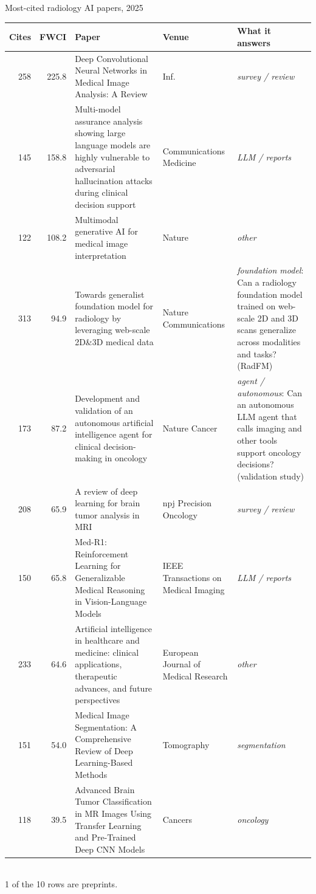 \documentclass[aspectratio=169]{beamer}
\renewcommand{\arraystretch}{1.08}
\begin{document}
\begin{frame}[category=Journals/Preprints]{Most-cited radiology AI papers, 2025}
\tiny
\begin{adjustbox}{max totalsize={\textwidth}{0.64\textheight}}
\renewcommand{\arraystretch}{1.2}
\begin{tabular}{|r|r|>{\raggedright\arraybackslash}p{}|>{\raggedright\arraybackslash}p{}|>{\raggedright\arraybackslash}p{}|}
\hline \textbf{Cites} & \textbf{FWCI} & \textbf{Paper} & \textbf{Venue} & \textbf{What it answers} \\ \hline
258 & 225.8 & Deep Convolutional Neural Networks in Medical Image Analysis: A Review & Inf. & \textit{survey / review} \\ \hline
145 & 158.8 & Multi-model assurance analysis showing large language models are highly vulnerable to adversarial hallucination attacks during clinical decision support & Communications Medicine & \textit{LLM / reports} \\ \hline
122 & 108.2 & Multimodal generative AI for medical image interpretation & Nature & \textit{other} \\ \hline
313 & 94.9 & Towards generalist foundation model for radiology by leveraging web-scale 2D\&3D medical data & Nature Communications & \textit{foundation model}: Can a radiology foundation model trained on web-scale 2D and 3D scans generalize across modalities and tasks? (RadFM) \\ \hline
173 & 87.2 & Development and validation of an autonomous artificial intelligence agent for clinical decision-making in oncology & Nature Cancer & \textit{agent / autonomous}: Can an autonomous LLM agent that calls imaging and other tools support oncology decisions? (validation study) \\ \hline
208 & 65.9 & A review of deep learning for brain tumor analysis in MRI & npj Precision Oncology & \textit{survey / review} \\ \hline
150 & 65.8 & Med-R1: Reinforcement Learning for Generalizable Medical Reasoning in Vision-Language Models & IEEE Transactions on Medical Imaging & \textit{LLM / reports} \\ \hline
233 & 64.6 & Artificial intelligence in healthcare and medicine: clinical applications, therapeutic advances, and future perspectives & European Journal of Medical Research & \textit{other} \\ \hline
151 & 54.0 & Medical Image Segmentation: A Comprehensive Review of Deep Learning-Based Methods & Tomography & \textit{segmentation} \\ \hline
118 & 39.5 & Advanced Brain Tumor Classification in MR Images Using Transfer Learning and Pre-Trained Deep CNN Models & Cancers & \textit{oncology} \\ \hline
\end{tabular}
\end{adjustbox}
\\[1pt]
{\tiny  1 of the 10 rows are preprints.}
\end{frame}
\end{document}
